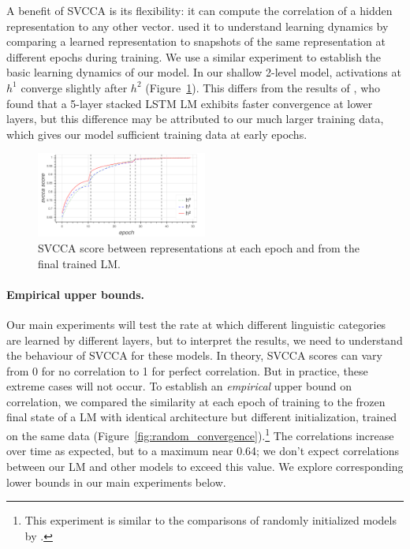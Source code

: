 A benefit of SVCCA is its flexibility: it can compute the correlation of a hidden representation to any other vector. \citeauthor{raghu_svcca:_2017} used it to understand learning dynamics by comparing a learned representation to snapshots of the same representation at different epochs during training. We use a similar experiment to establish the basic learning dynamics of our model. In our shallow 2-level model, activations at $h^1$ converge slightly after $h^2$ (Figure~\ref{fig:final_convergence}). This differs from the results of \citeauthor{raghu_svcca:_2017}, who found that a 5-layer stacked LSTM LM exhibits faster convergence at lower layers, but this difference may be attributed to our much larger training data, which gives our model sufficient training data at early epochs. 

\begin{figure}
\includegraphics[width=0.5\textwidth]{svcca/final_correlation}
\caption{SVCCA score between representations at each epoch and from the final trained LM.}
\label{fig:final_convergence}
\end{figure}

\paragraph{Empirical upper bounds.} Our main experiments will test the rate at which different linguistic categories are learned by different layers, but to interpret the results, we need to understand the behaviour of SVCCA for these models. In theory, SVCCA scores can vary from 0 for no correlation to 1 for perfect correlation. But in practice, these extreme cases will not occur. To establish an \emph{empirical} upper bound on correlation, we compared the similarity at each epoch of training to the frozen final state of a LM with identical architecture but different initialization, trained on the same data (Figure~\ref{fig:random_convergence}).\footnote{This experiment is similar to the comparisons of randomly initialized models by \citeauthor{morcos_insights_2018}.} The correlations increase over time as expected, but to a maximum near 0.64; we don't expect correlations between our LM and other models to exceed this value. We explore corresponding lower bounds in our main experiments below.

